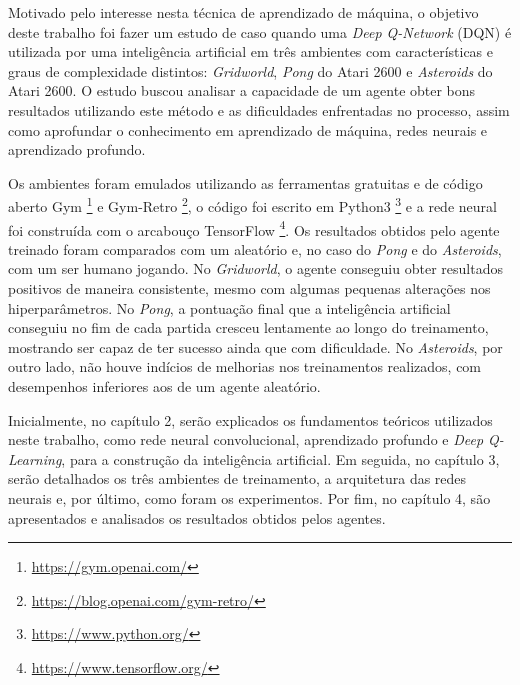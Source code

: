 Motivado pelo interesse nesta técnica de aprendizado de máquina, o objetivo deste trabalho foi fazer um estudo de caso quando uma \textit{Deep Q-Network} (DQN) é utilizada por uma inteligência artificial em três ambientes com características e graus de complexidade distintos: \textit{Gridworld}, \textit{Pong} do Atari 2600 e \textit{Asteroids} do Atari 2600.
O estudo buscou analisar a capacidade de um agente obter bons resultados utilizando este método e as dificuldades enfrentadas no processo, assim como aprofundar o conhecimento em aprendizado de máquina, redes neurais e aprendizado profundo.

Os ambientes foram emulados utilizando as ferramentas gratuitas e de código aberto Gym \footnote{\url{https://gym.openai.com/}} e Gym-Retro \footnote{\url{https://blog.openai.com/gym-retro/}}, o código foi escrito em Python3 \footnote{\url{https://www.python.org/}} e a rede neural foi construída com o arcabouço TensorFlow \footnote{\url{https://www.tensorflow.org/}}.
Os resultados obtidos pelo agente treinado foram comparados com um aleatório e, no caso do \textit{Pong} e do \textit{Asteroids}, com um ser humano jogando.
No \textit{Gridworld}, o agente conseguiu obter resultados positivos de maneira consistente, mesmo com algumas pequenas alterações nos hiperparâmetros.
No \textit{Pong}, a pontuação final que a inteligência artificial conseguiu no fim de cada partida cresceu lentamente ao longo do treinamento, mostrando ser capaz de ter sucesso ainda que com dificuldade.
No \textit{Asteroids}, por outro lado, não houve indícios de melhorias nos treinamentos realizados, com desempenhos inferiores aos de um agente aleatório.

Inicialmente, no capítulo 2, serão explicados os fundamentos teóricos utilizados neste trabalho, como rede neural convolucional, aprendizado profundo e \textit{Deep Q-Learning}, para a construção da inteligência artificial.
Em seguida, no capítulo 3, serão detalhados os três ambientes de treinamento, a arquitetura das redes neurais e, por último, como foram os experimentos.
Por fim, no capítulo 4, são apresentados e analisados os resultados obtidos pelos agentes.
